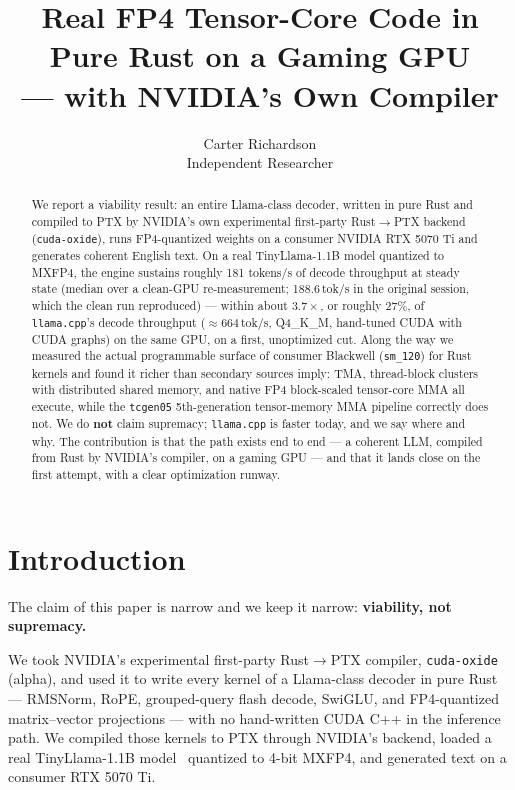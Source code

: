 \documentclass[11pt]{article}
\title{Real FP4 Tensor-Core Code in Pure Rust on a Gaming GPU\\--- with NVIDIA's Own Compiler}
\author{Carter Richardson\\Independent Researcher}
\date{}
\begin{document}
\maketitle
\begin{abstract}
We report a viability result: an entire Llama-class decoder, written in pure Rust and compiled to PTX by NVIDIA's own experimental first-party Rust$\rightarrow$PTX backend (\texttt{cuda-oxide}), runs FP4-quantized weights on a consumer NVIDIA RTX 5070 Ti and generates coherent English text. On a real TinyLlama-1.1B model quantized to MXFP4, the engine sustains roughly 181 tokens/s of decode throughput at steady state (median over a clean-GPU re-measurement; 188.6\,tok/s in the original session, which the clean run reproduced) --- within about $3.7\times$, or roughly 27\%, of \texttt{llama.cpp}'s decode throughput ($\approx\!664$\,tok/s, Q4\_K\_M, hand-tuned CUDA with CUDA graphs) on the same GPU, on a first, unoptimized cut. Along the way we measured the actual programmable surface of consumer Blackwell (\texttt{sm\_120}) for Rust kernels and found it richer than secondary sources imply: TMA, thread-block clusters with distributed shared memory, and native FP4 block-scaled tensor-core MMA all execute, while the \texttt{tcgen05} 5th-generation tensor-memory MMA pipeline correctly does not. We do \textbf{not} claim supremacy; \texttt{llama.cpp} is faster today, and we say where and why. The contribution is that the path exists end to end --- a coherent LLM, compiled from Rust by NVIDIA's compiler, on a gaming GPU --- and that it lands close on the first attempt, with a clear optimization runway.
\end{abstract}

\section{Introduction}
The claim of this paper is narrow and we keep it narrow: \textbf{viability, not supremacy.}

We took NVIDIA's experimental first-party Rust$\rightarrow$PTX compiler, \texttt{cuda-oxide} (alpha), and used it to write every kernel of a Llama-class decoder in pure Rust --- RMSNorm, RoPE, grouped-query flash decode, SwiGLU, and FP4-quantized matrix--vector projections --- with no hand-written CUDA C++ in the inference path. We compiled those kernels to PTX through NVIDIA's backend, loaded a real TinyLlama-1.1B model~\citep{tinyllama} quantized to 4-bit MXFP4, and generated text on a consumer RTX 5070 Ti.
\end{document}
